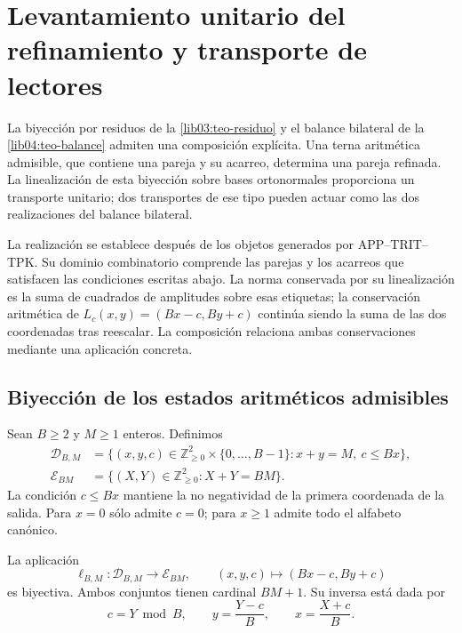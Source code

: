 \section{Levantamiento unitario del refinamiento y transporte de lectores}
\label{lib05:levantamiento}

La biyección por residuos de la \cref{lib03:teo-residuo} y el
balance bilateral de la \cref{lib04:teo-balance} admiten una
composición explícita. Una terna aritmética admisible, que contiene
una pareja y su acarreo, determina una pareja refinada. La
linealización de esta biyección sobre bases ortonormales proporciona
un transporte unitario; dos transportes de ese tipo pueden actuar
como las dos realizaciones del balance bilateral.

La realización se establece después de los objetos generados por
APP--TRIT--TPK. Su dominio combinatorio comprende las parejas y los
acarreos que satisfacen las condiciones escritas abajo. La norma
conservada por su linealización es la suma de cuadrados de amplitudes
sobre esas etiquetas; la conservación aritmética de
\(L_c(x,y)=(Bx-c,By+c)\) continúa siendo la suma de las dos
coordenadas tras reescalar. La composición relaciona ambas
conservaciones mediante una aplicación concreta.

\subsection{Biyección de los estados aritméticos admisibles}
\label{lib05:biyeccion}

Sean \(B\geq2\) y \(M\geq1\) enteros. Definimos
\begin{align}
 \mathcal D_{B,M}
 &=\bigl\{(x,y,c)\in\mathbb Z_{\geq0}^2
                 \times\{0,\ldots,B-1\}:x+y=M,\ c\leq Bx\bigr\},
 \label{lib05:dominio}\\
 \mathcal E_{BM}
 &=\bigl\{(X,Y)\in\mathbb Z_{\geq0}^2:X+Y=BM\bigr\}.
 \label{lib05:codominio}
\end{align}
La condición \(c\leq Bx\) mantiene la no negatividad de la
primera coordenada de la salida. Para \(x=0\) sólo admite
\(c=0\); para \(x\geq1\) admite todo el alfabeto canónico.

\begin{theorem}
\label{lib05:teo-biyeccion}
La aplicación
\begin{equation}
 \ell_{B,M}:\mathcal D_{B,M}\longrightarrow\mathcal E_{BM},
 \qquad (x,y,c)\longmapsto(Bx-c,By+c)
 \label{lib05:mapa-etiquetas}
\end{equation}
es biyectiva. Ambos conjuntos tienen cardinal \(BM+1\). Su inversa
está dada por
\begin{equation}
 c=Y\bmod B,\qquad y=\frac{Y-c}{B},\qquad x=\frac{X+c}{B}.
 \label{lib05:inversa-etiquetas}
\end{equation}
\end{theorem}

